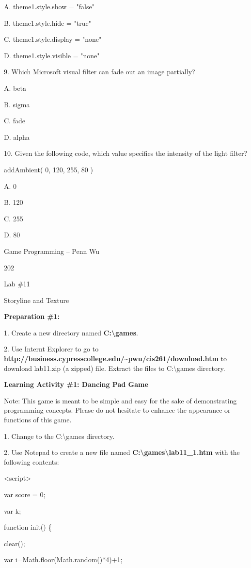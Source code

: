 \documentclass[
]{article}
\begin{document}
A. theme1.style.show = "false"

B. theme1.style.hide = "true"

C. theme1.style.display = "none"

D. theme1.style.visible = "none"

9. Which Microsoft visual filter can fade out an image partially?

A. beta

B. sigma

C. fade

D. alpha

10. Given the following code, which value specifies the intensity of the
light filter?

addAmbient( 0, 120, 255, 80 )

A. 0

B. 120

C. 255

D. 80

Game Programming -- Penn Wu

202

\protect\hypertarget{index_split_011.htmlux5cux23p203}{}{}

Lab \#11

Storyline and Texture

\textbf{Preparation \#1:}

1. Create a new directory named \textbf{C:\textbackslash games}.

2. Use Internt Explorer to go to
\textbf{http://business.cypresscollege.edu/\textasciitilde pwu/cis261/download.htm}
to download lab11.zip (a zipped) file. Extract the files to
C:\textbackslash games directory.

\textbf{Learning Activity \#1: Dancing Pad Game}

Note: This game is meant to be simple and easy for the sake of
demonstrating programming concepts. Please do not hesitate to enhance
the appearance or functions of this game.

1. Change to the C:\textbackslash games directory.

2. Use Notepad to create a new file named
\textbf{C:\textbackslash games\textbackslash lab11\_1.htm} with the
following contents:

\textless script\textgreater{}

var score = 0;

var k;

function init() \{

clear();

var i=Math.floor(Math.random()*4)+1;
\end{document}
